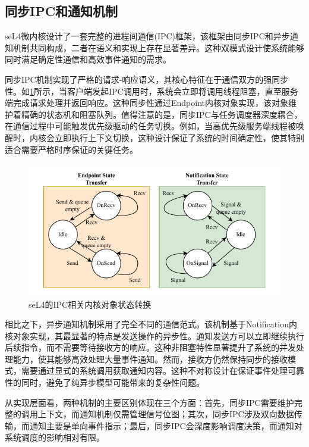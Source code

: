 \subsection{同步IPC和通知机制}
\label{sec:sel4_ipc}
seL4微内核设计了一套完整的进程间通信(IPC)框架，该框架由同步IPC和异步通知机制共同构成，二者在语义和实现上存在显著差异。这种双模式设计使系统能够同时满足确定性通信和高效事件通知的需求。


同步IPC机制实现了严格的请求-响应语义，其核心特征在于通信双方的强同步性。如\ref{fig:seL4_ipc_state}所示，当客户端发起IPC调用时，系统会立即将调用线程阻塞，直至服务端完成请求处理并返回响应。这种同步性通过Endpoint内核对象实现，该对象维护着精确的状态机和阻塞队列。值得注意的是，同步IPC与任务调度器深度耦合，在通信过程中可能触发优先级驱动的任务切换。例如，当高优先级服务端线程被唤醒时，内核会立即执行上下文切换，这种设计保证了系统的时间确定性，使其特别适合需要严格时序保证的关键任务。

\begin{figure}[htbp]
  \centering
  \includegraphics{figures/seL4_ipc_state.drawio.pdf}
  \caption{seL4的IPC相关内核对象状态转换}\label{fig:seL4_ipc_state}
\end{figure}

相比之下，异步通知机制采用了完全不同的通信范式。该机制基于Notification内核对象实现，其最显著的特点是发送操作的异步性。通知发送方可以立即继续执行后续指令，而不需要等待接收方的响应。这种非阻塞特性显著提升了系统的并发处理能力，使其能够高效处理大量事件通知。然而，接收方仍然保持同步的接收模式，需要通过显式的系统调用获取通知内容。这种不对称设计在保证事件处理可靠性的同时，避免了纯异步模型可能带来的复杂性问题。

从实现层面看，两种机制的主要区别体现在三个方面：首先，同步IPC需要维护完整的调用上下文，而通知机制仅需管理信号位图；其次，同步IPC涉及双向数据传输，而通知主要是单向事件指示；最后，同步IPC会深度影响调度决策，而通知对系统调度的影响相对有限。


